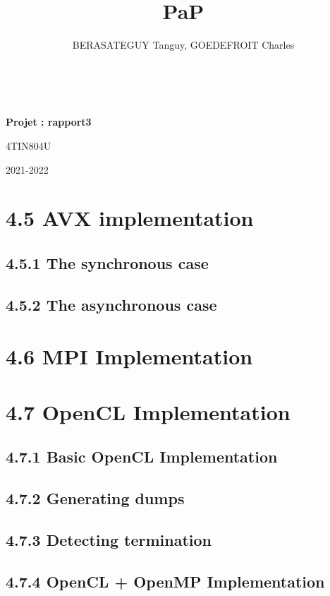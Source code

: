 \documentclass[10pt, a4paper]{article}
\title{PaP}
\author{BERASATEGUY Tanguy, GOEDEFROIT Charles}
\begin{document}
\begin{titlepage}
  \centering
  \ {} %
  \vfill
  \vspace{1cm}
  {\scshape\LARGE\MyTitle\par}
  \vspace{0.5cm}
  {\huge\bfseries Projet : rapport3\par}
  \vspace{0.5cm}
  {\Large 4TIN804U\par}
  \vspace{1cm}
  \MyAuthor
  \vfill
  {\large2021-2022\par}
\end{titlepage}

\newpage

\tableofcontents

\newpage

\section{4.5 AVX implementation}

\subsection{4.5.1 The synchronous case}

\subsection{4.5.2 The asynchronous case}

\section{4.6 MPI Implementation}

\section{4.7 OpenCL Implementation}

\subsection{4.7.1 Basic OpenCL Implementation}

\subsection{4.7.2 Generating dumps}

\subsection{4.7.3 Detecting termination}

\subsection{4.7.4 OpenCL + OpenMP Implementation}
\end{document}
